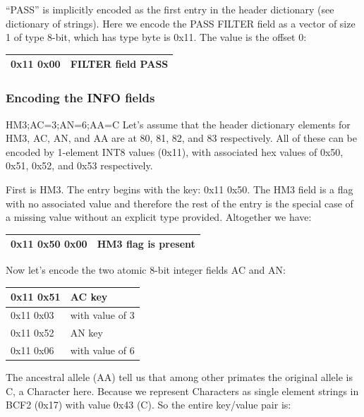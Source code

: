 \documentclass[8pt]{article}
\begin{document}
``PASS'' is implicitly encoded as the first entry in the header dictionary (see dictionary of strings).
Here we encode the PASS FILTER field as a vector of size 1 of type 8-bit, which has type byte is 0x11.
The value is the offset 0:

\vspace{0.3cm}
\begin{tabular}{|l| l|} \hline
0x11 0x00 & FILTER field PASS \\ \hline
\end{tabular}

\subsubsection{Encoding the INFO fields}

HM3;AC=3;AN=6;AA=C
Let's assume that the header dictionary elements for HM3, AC, AN, and AA are at 80, 81, 82, and 83 respectively.
All of these can be encoded by 1-element INT8 values (0x11), with associated hex values of 0x50, 0x51, 0x52, and 0x53 respectively.

First is HM3.
The entry begins with the key: 0x11 0x50.
The HM3 field is a flag with no associated value and therefore the rest of the entry is the special case of a missing value without an explicit type provided.
Altogether we have:

\vspace{0.3cm}
\begin{tabular}{|l| l|} \hline
0x11 0x50 0x00 & HM3 flag is present \\ \hline
\end{tabular}
\vspace{0.3cm}

Now let's encode the two atomic 8-bit integer fields AC and AN:

\vspace{0.3cm}
\begin{tabular}{|l| l|} \hline
0x11 0x51 & AC key \\ \hline
0x11 0x03 & with value of 3 \\ \hline
0x11 0x52 & AN key \\ \hline
0x11 0x06 & with value of 6 \\ \hline
\end{tabular}
\vspace{0.3cm}

The ancestral allele (AA) tell us that among other primates the original allele is C, a Character here.
Because we represent Characters as single element strings in BCF2 (0x17) with value 0x43 (C).
So the entire key/value pair is:
\end{document}
